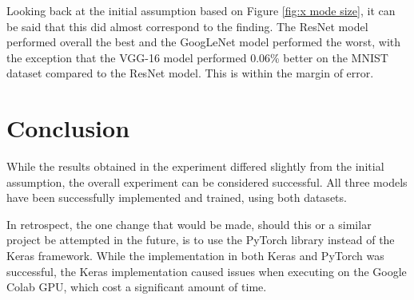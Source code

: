 \documentclass[conference]{IEEEtran}
\begin{document}
Looking back at the initial assumption based on Figure \ref{fig:x mode size}, it can be said that this did almost correspond to the finding.
The ResNet model performed overall the best and the GoogLeNet model performed the worst, with the exception that the VGG-16 model performed 0.06\% better on the MNIST dataset compared to the ResNet model. 
This is within the margin of error.
\section{Conclusion}\label{C6}
While the results obtained in the experiment differed slightly from the initial assumption, the overall experiment can be considered successful.
All three models have been successfully implemented and trained, using both datasets.

In retrospect, the one change that would be made, should this or a similar project be attempted in the future, is to use the PyTorch library instead of the Keras framework.
While the implementation in both Keras and PyTorch was successful, the Keras implementation caused issues when executing on the Google Colab GPU, which cost a significant amount of time.

\printbibliography
\end{document}

